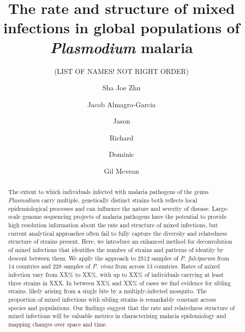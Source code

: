 \documentclass{article}
\newcounter{todocounter}
\newcommand{\done}[2][]
{\todo[color=green!40, #1]{#2}}
\newcommand{\donenum}[2][]
{\stepcounter{todocounter}\done[#1]{\thetodocounter: #2}}
\begin{document}
\title{The rate and structure of mixed infections in global populations of {\it Plasmodium} malaria}
\newcommand\shorttitle{Global malaria mixed infection}
\date{}

\author{(LIST OF NAMES! NOT RIGHT ORDER)}
\author[1,2]{Sha Joe Zhu}
\author[1,2,3,4]{Jacob Almagro-Garcia}
\author[2]{Jason}
\author[1,3,4]{Richard}
\author[1,2,3,4]{Dominic}
\author[1,2]{Gil Mcvean}


\maketitle
{}
\listoftodos
{}





\begin{abstract}
The extent to which individuals infected with malaria pathogens of the genus {\it Plasmodium} carry multiple, genetically distinct strains both reflects local epidemiological processes and can influence the nature and severity of disease.  Large-scale genome sequencing projects of malaria pathogens have the potential to provide high resolution information about the rate and structure of mixed infections, but current analytical approaches often fail to fully capture the diversity and relatedness structure of strains present.  Here, we introduce an enhanced method for deconvolution of mixed infections that identifies the number of strains and patterns of identity by descent between them.  We apply the approach to 2512 samples of {\it P. falciparum} from 14 countries and 228 samples of {\it P. vivax} from across 13 countries.
Rates of mixed infection vary from XX\% to XX\%, with up to XX\% of individuals carrying at least three strains in XXX.  In between XX\% and XX\% of cases we find evidence for sibling strains, likely arising from a single bite by a multiply-infected mosquito.  The proportion of mixed infections with sibling strains is remarkably constant across species and populations.  Our findings suggest that the rate and relatedness structure of mixed infections will be valuable metrics in characterising malaria epidemiology and mapping changes over space and time.
\end{abstract}
\end{document}
